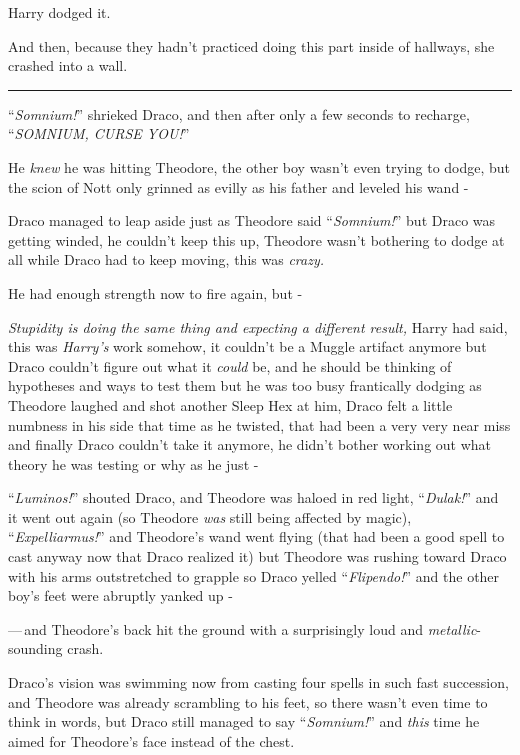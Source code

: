 Harry dodged it.

And then, because they hadn't practiced doing this part inside of hallways, she crashed into a wall.

\begin{center}\rule{3in}{0.4pt}\end{center}

``\emph{Somnium!}'' shrieked Draco, and then after only a few seconds to recharge, ``\emph{SOMNIUM, CURSE YOU!}''

He \emph{knew} he was hitting Theodore, the other boy wasn't even trying to dodge, but the scion of Nott only grinned as evilly as his father and leveled his wand -

Draco managed to leap aside just as Theodore said ``\emph{Somnium!}'' but Draco was getting winded, he couldn't keep this up, Theodore wasn't bothering to dodge at all while Draco had to keep moving, this was \emph{crazy.}

He had enough strength now to fire again, but -

\emph{Stupidity is doing the same thing and expecting a different result,} Harry had said, this was \emph{Harry's} work somehow, it couldn't be a Muggle artifact anymore but Draco couldn't figure out what it \emph{could} be, and he should be thinking of hypotheses and ways to test them but he was too busy frantically dodging as Theodore laughed and shot another Sleep Hex at him, Draco felt a little numbness in his side that time as he twisted, that had been a very very near miss and finally Draco couldn't take it anymore, he didn't bother working out what theory he was testing or why as he just -

``\emph{Luminos!}'' shouted Draco, and Theodore was haloed in red light, ``\emph{Dulak!}'' and it went out again (so Theodore \emph{was} still being affected by magic), ``\emph{Expelliarmus!}'' and Theodore's wand went flying (that had been a good spell to cast anyway now that Draco realized it) but Theodore was rushing toward Draco with his arms outstretched to grapple so Draco yelled ``\emph{Flipendo!}'' and the other boy's feet were abruptly yanked up -

---\,and Theodore's back hit the ground with a surprisingly loud and \emph{metallic}-sounding crash.

Draco's vision was swimming now from casting four spells in such fast succession, and Theodore was already scrambling to his feet, so there wasn't even time to think in words, but Draco still managed to say ``\emph{Somnium!}'' and \emph{this} time he aimed for Theodore's face instead of the chest.

